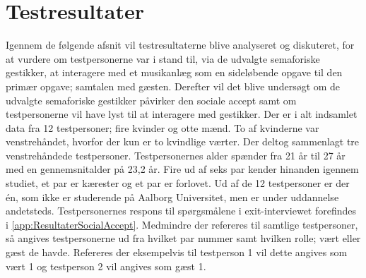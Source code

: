 \chapter{Testresultater}
\label{TestresultaterSocialAccept}
%
Igennem de følgende afsnit vil testresultaterne blive analyseret og diskuteret, for at vurdere om testpersonerne var i stand til, via de udvalgte semaforiske gestikker, at interagere med et musikanlæg som en sideløbende opgave til den primær opgave; samtalen med gæsten. Derefter vil det blive undersøgt om de udvalgte semaforiske gestikker påvirker den sociale accept samt om testpersonerne vil have lyst til at interagere med gestikker.\blankline
%
Der er i alt indsamlet data fra 12 testpersoner; fire kvinder og otte mænd. To af kvinderne var venstrehåndet, hvorfor der kun er to kvindlige værter. Der deltog sammenlagt tre venstrehåndede testpersoner. Testpersonernes alder spænder fra 21 år til 27 år med en gennemsnitalder på 23,2 år. Fire ud af seks par kender hinanden igennem studiet, et par er kærester og et par er forlovet. Ud af de 12 testpersoner er der én, som ikke er studerende på Aalborg Universitet, men er under uddannelse andetsteds. Testpersonernes respons til spørgsmålene i exit-interviewet forefindes i \autoref{app:ResultaterSocialAccept}. Medmindre der refereres til samtlige testpersoner, så angives testpersonerne ud fra hvilket par nummer samt hvilken rolle; vært eller gæst de havde. Refereres der eksempelvis til testperson 1 vil dette angives som vært 1 og testperson 2 vil angives som gæst 1. 





